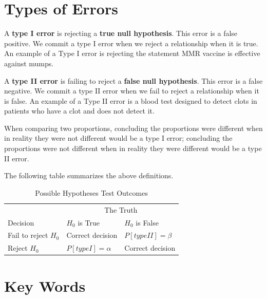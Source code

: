 \documentclass[11pt, chapterprefix=true]{scrbook}\usepackage[]{graphicx}\usepackage[]{color}
\begin{document}
\begin{itemize}
\end{itemize}

\section{Types of Errors}

A \textbf{type I error} is rejecting a \textbf{true null hypothesis}.  This error is a false positive.   We commit a type I error when we reject a relationship when it is true.  An example of a Type I error is rejecting the statement MMR vaccine is effective against mumps.

A \textbf{type II error} is failing to reject a \textbf{false null hypothesis}.  This error is a false negative.  We commit a type II error when we fail to reject a relationship when it is false.  An example of a Type II error is a blood test designed to detect clots in patients who have a clot and does not detect it.

When comparing two proportions, concluding the proportions were different when in reality they were not different would be a type I error; concluding the proportions were not different when in reality they were different would be a type II error. 

The following table summarizes the above definitions.

\begin{table}[ht]
\centering

\begin{tabular}{@{} p{3cm} p{3cm} p{3cm}  @{}}
 &   \multicolumn{2}{c}{The Truth} \\
 Decision & $H_0$ is True & $H_0$ is False \\ \hline
 Fail to reject $H_0$ & Correct decision & $P[type II] = \beta$ \\
 Reject $H_0$         & $P[type I] = \alpha$ & Correct decision \\ \hline
 \end{tabular}
 \caption{Possible Hypotheses Test Outcomes}
 \end{table}
 


\section{Key Words}

\end{document}
